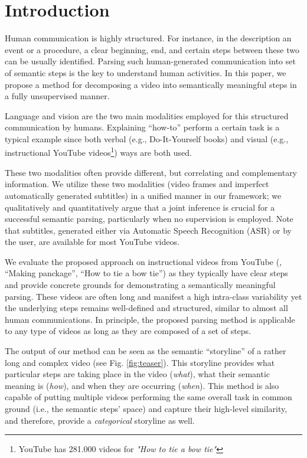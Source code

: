 \section{Introduction}
Human communication is highly structured. For instance, in the description an event or a procedure, a clear beginning, end, and certain steps between these two can be usually identified. Parsing such human-generated communication into set of semantic steps is the key to understand human activities. In this paper, we propose a method for decomposing a video into semantically meaningful steps in a fully unsupervised manner.

Language and vision are the two main modalities employed for this structured communication by humans. Explaining ``how-to'' perform a certain task is a typical example since both verbal (e.g., Do-It-Yourself books) and visual (e.g., instructional YouTube videos\footnote{YouTube has 281.000 videos for \emph{"How to tie a bow tie"}}) ways are both used.

These two modalities often provide different, but correlating and complementary information. We utilize these two modalities (video frames and imperfect automatically generated subtitles) in a unified manner in our framework; we qualitatively and quantitatively argue that a joint inference is crucial for a successful semantic parsing, particularly when no supervision is employed. Note that subtitles, generated either via Automatic Speech Recognition (ASR) or by the user, are available for most YouTube videos.

We evaluate the proposed approach on instructional videos from YouTube (\eg, ``Making panckage'', ``How to tie a bow tie'') as they typically have clear steps and provide concrete grounds for demonstrating a semantically meaningful parsing. These videos are often long and manifest a high intra-class variability yet the underlying steps remains well-defined and structured, similar to almost all human communications. In principle, the proposed parsing method is applicable to any type of videos as long as they are composed of a set of steps.

The output of our method can be seen as the semantic ``storyline'' of a rather long and complex video (see Fig. \ref{fig:teaser}). This storyline provides what particular steps are taking place in the video (\emph{what}), what their semantic meaning is (\emph{how}), and when they are occurring (\emph{when}). This method is also capable of putting multiple videos performing the same overall task in common ground (i.e., the semantic steps’ space) and capture their high-level similarity, and therefore, provide a \emph{categorical} storyline as well.

